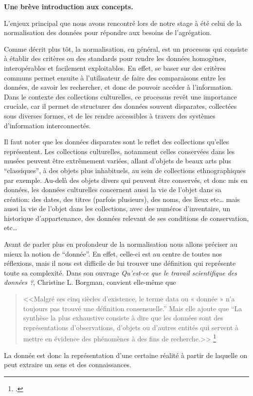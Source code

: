 \textbf{Une brève introduction aux concepts.}\newline

L’enjeux principal que nous avons rencontré lors de notre stage à été celui de la normalisation des données pour répondre aux besoins de l’agrégation.  \newline

Comme décrit plus tôt, la normalisation, en général, est un processus qui consiste à établir des critères ou des standards pour rendre les données homogènes, interopérables et facilement exploitables. En effet, se baser sur des critères communs permet ensuite à l’utilisateur de faire des comparaisons entre les données, de savoir les rechercher, et donc de pouvoir accéder à l’information. Dans le contexte des collections culturelles, ce processus revêt une importance cruciale, car il permet de structurer des données souvent disparates, collectées sous diverses formes, et de les rendre accessibles à travers des systèmes d’information interconnectés. \newline

Il faut noter que les données disparates sont le reflet des collections qu’elles représentent. Les collections culturelles, notamment celles conservées dans les musées peuvent être extrêmement variées, allant d’objets de beaux arts plus “classiques”, à des objets plus inhabituels, au sein de collections ethnographiques par exemple. 
Au-delà des objets divers qui peuvent être conservés, et donc mis en données, les données culturelles concernent aussi la vie de l’objet dans sa création: des dates, des titres (parfois plusieurs), des noms, des lieux etc… mais aussi la vie de l’objet dans les collections, avec des numéros d’inventaire, un historique d'appartenance, des données relevant de ses conditions de conservation, etc… \newline

Avant de parler plus en profondeur de la normalisation nous allons préciser au mieux la notion de “donnée”. En effet, celle-ci est au centre de toutes nos réflexions, mais il nous est difficile de lui trouver une définition qui représente toute sa complexité.
Dans son ouvrage \textit{Qu’est-ce que le travail scientifique des données ?}, Christine L. Borgman, convient elle-même que \begin{quote}
    <<Malgré ses cinq siècles d’existence, le terme data ou « donnée » n’a toujours pas trouvé une définition consensuelle.” Mais elle ajoute que “La synthèse la plus exhaustive consiste à dire que les données sont des représentations d’observations, d’objets ou d’autres entités qui servent à mettre en évidence des phénomènes à des fins de recherche.>> \footcite{borman_2020}
\end{quote}
La donnée est donc la représentation d’une certaine réalité à partir de laquelle on peut extraire un sens et des connaissances.
